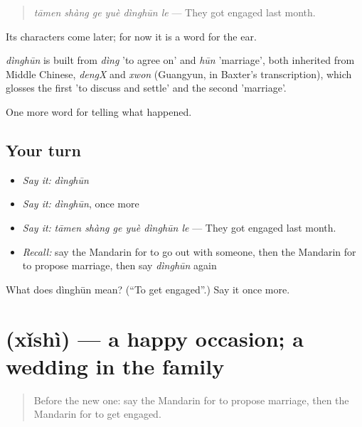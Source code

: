 \begin{quote}
\emph{tāmen shàng ge yuè dìnghūn le} — They got engaged last month.
\end{quote}

Its characters come later; for now it is a word for the ear.

\begin{cousinweb}
\emph{dìnghūn} is built from \emph{dìng} 'to agree on' and \emph{hūn} 'marriage', both inherited from Middle Chinese, \emph{dengX} and \emph{xwon} (Guangyun, in Baxter's transcription), which glosses the first 'to discuss and settle' and the second 'marriage'.
\end{cousinweb}

\begin{grammarlens}[title={What you've built}]
One more word for telling what happened.
\end{grammarlens}

\subsection*{Your turn}
\begin{itemize}
\raggedright
  \item \emph{Say it:} \emph{dìnghūn}
  \item \emph{Say it:} \emph{dìnghūn}, once more
  \item \emph{Say it:} \emph{tāmen shàng ge yuè dìnghūn le} — They got engaged last month.
  \item \emph{Recall:} say the Mandarin for to go out with someone, then the Mandarin for to propose marriage, then say \emph{dìnghūn} again
\end{itemize}

\begin{tcolorbox}[breakable,colback=teal!4,colframe=teal!35!black,title={Before you move on}]
What does dìnghūn mean? (\textquotedblleft{}To get engaged\textquotedblright{}.) Say it once more.
\end{tcolorbox}
\section[\texorpdfstring{\zh{喜事} (xǐshì)}{喜事 (xǐshì)}]{ (xǐshì) — a happy occasion; a wedding in the family}

\label{lesson:ZH-C305-xishi}



\begin{quote}
Before the new one: say the Mandarin for to propose marriage, then the Mandarin for to get engaged.
\end{quote}

